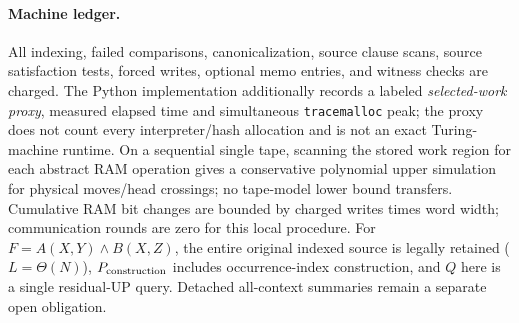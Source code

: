\documentclass[11pt]{article}
\begin{document}
\paragraph{Machine ledger.}
All indexing, failed comparisons, canonicalization, source clause scans, source satisfaction tests, forced writes, optional memo entries, and witness checks are charged. The Python implementation additionally records a labeled \emph{selected-work proxy}, measured elapsed time and simultaneous \texttt{tracemalloc} peak; the proxy does not count every interpreter/hash allocation and is not an exact Turing-machine runtime. On a sequential single tape, scanning the stored work region for each abstract RAM operation gives a conservative polynomial upper simulation for physical moves/head crossings; no tape-model lower bound transfers. Cumulative RAM bit changes are bounded by charged writes times word width; communication rounds are zero for this local procedure. For $F=A(X,Y)\land B(X,Z)$, the entire original indexed source is legally retained ($L=\Theta(N)$), $P_{\rm construction}$ includes occurrence-index construction, and $Q$ here is a single residual-UP query. Detached all-context summaries remain a separate open obligation.
\end{document}
